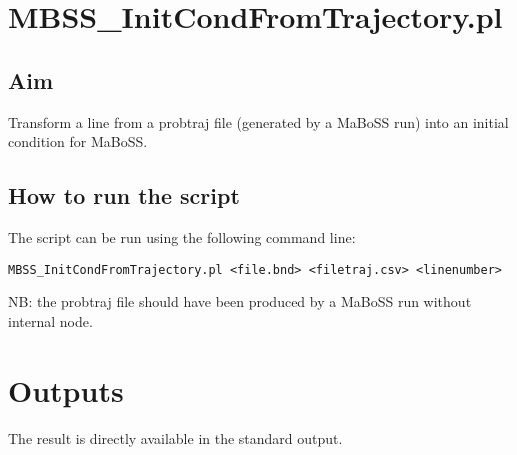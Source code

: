 \documentclass{article}
\begin{document}
\section*{MBSS\_InitCondFromTrajectory.pl}
\subsection*{Aim}
Transform a line from a probtraj file (generated by a MaBoSS run) into an initial condition for MaBoSS.

\subsection*{How to run the script}
The script can be run using the following command line: 

\begin{verbatim}
MBSS_InitCondFromTrajectory.pl <file.bnd> <filetraj.csv> <linenumber>
\end{verbatim}

NB: the probtraj file should have been produced by a MaBoSS run without internal node.

\section*{Outputs}
The result is directly available in the standard output.
\end{document}
